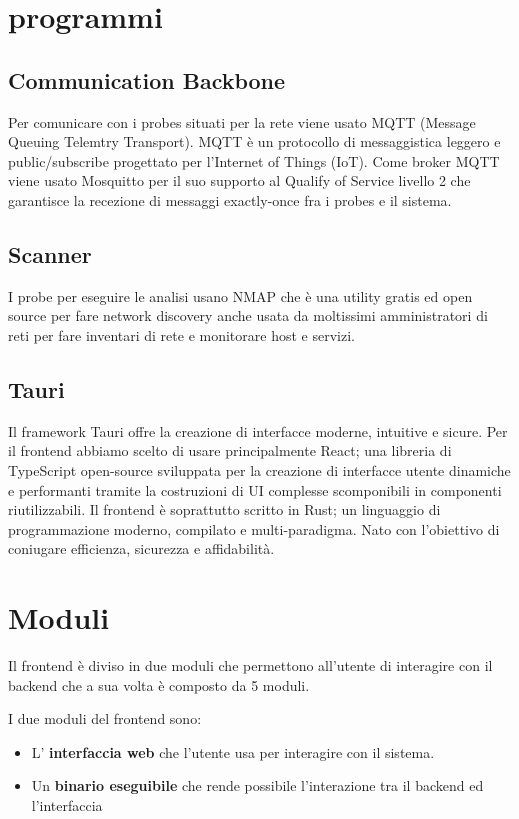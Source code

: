 \documentclass[target=bach,aauheader=,style=]{thud}
\begin{document}
\section{programmi}

\subsection{Communication Backbone}
Per comunicare con i probes situati per la rete viene usato MQTT (Message Queuing Telemtry Transport). 
MQTT è un protocollo di messaggistica leggero e public/subscribe progettato per l'Internet of Things (IoT).
Come broker MQTT viene usato Mosquitto per il suo supporto al Qualify of Service livello 2 che garantisce la recezione di messaggi exactly-once fra i probes e il sistema.

\subsection{Scanner}
I probe per eseguire le analisi usano NMAP che è una utility gratis ed open source per fare network discovery anche usata da moltissimi amministratori di reti per fare inventari di rete e monitorare host e servizi. 

\subsection{Tauri}
Il framework Tauri offre la creazione di interfacce moderne, intuitive e sicure.
Per il frontend abbiamo scelto di usare principalmente React; una libreria di TypeScript  open-source sviluppata per la creazione di interfacce utente dinamiche e performanti tramite la costruzioni di UI complesse scomponibili in componenti riutilizzabili.
Il frontend è soprattutto scritto in Rust; un linguaggio di programmazione moderno, compilato e multi-paradigma. Nato con l'obiettivo di coniugare efficienza, sicurezza e affidabilità.


\section{Moduli}
Il frontend è diviso in due moduli che permettono all'utente di interagire con il backend che a sua volta è composto da 5 moduli. 

I due moduli del frontend sono:
\begin{itemize}
  \item L' \textbf{interfaccia web} che l'utente usa per interagire con il sistema. 
  \item Un \textbf{binario eseguibile} che rende possibile l'interazione tra il backend ed l'interfaccia
\end{itemize}
\end{document}
